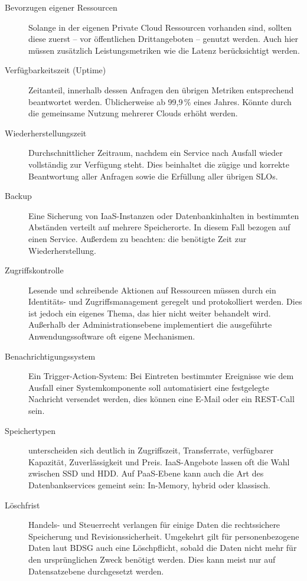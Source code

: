 \begin{description}
	\item[Bevorzugen eigener Ressourcen] Solange in der eigenen Private Cloud Ressourcen vorhanden sind, sollten diese zuerst -- vor öffentlichen Drittangeboten -- genutzt werden. Auch hier müssen zusätzlich Leistungsmetriken wie die Latenz berücksichtigt werden.
	
	\item[Verfügbarkeitszeit (Uptime)] Zeitanteil, innerhalb dessen Anfragen den übrigen Metriken entsprechend beantwortet werden. Üblicherweise ab 99,9\,\% eines Jahres. Könnte durch die gemeinsame Nutzung mehrerer Clouds erhöht werden.
	
	\item[Wiederherstellungszeit] Durchschnittlicher Zeitraum, nachdem ein Service nach Ausfall wieder vollständig zur Verfügung steht. Dies beinhaltet die zügige und korrekte Beantwortung aller Anfragen sowie die Erfüllung aller übrigen SLOs.
	
	\item[Backup] Eine Sicherung von IaaS-Instanzen oder Datenbankinhalten in bestimmten Abständen verteilt auf mehrere Speicherorte. In diesem Fall bezogen auf einen Service. Außerdem zu beachten: die benötigte Zeit zur Wiederherstellung.
	
	\item[Zugriffskontrolle] Lesende und schreibende Aktionen auf Ressourcen müssen durch ein Identitäts- und Zugriffsmanagement geregelt und protokolliert werden. Dies ist jedoch ein eigenes Thema, das hier nicht weiter behandelt wird. Außerhalb der Administrationsebene implementiert die ausgeführte Anwendungssoftware oft eigene Mechanismen.
	
	\item[Benachrichtigungssystem] Ein Trigger-Action-System: Bei Eintreten bestimmter Ereignisse wie dem Ausfall einer Systemkomponente soll automatisiert eine festgelegte Nachricht versendet werden, dies können eine E-Mail oder ein REST-Call sein.
	
	\item[Speichertypen] unterscheiden sich deutlich in Zugriffszeit, Transferrate, verfügbarer Kapazität, Zuverlässigkeit und Preis. IaaS-Angebote lassen oft die Wahl zwischen SSD und HDD. Auf PaaS-Ebene kann auch die Art des Datenbankservices gemeint sein: In-Memory, hybrid oder klassisch.
	
	\item[Löschfrist] Handels- und Steuerrecht verlangen für einige Daten die rechtssichere Speicherung und Revisionssicherheit. Umgekehrt gilt für personenbezogene Daten laut BDSG auch eine Löschpflicht, sobald die Daten nicht mehr für den ursprünglichen Zweck benötigt werden. Dies kann meist nur auf Datensatzebene durchgesetzt werden.
	

\end{description}
